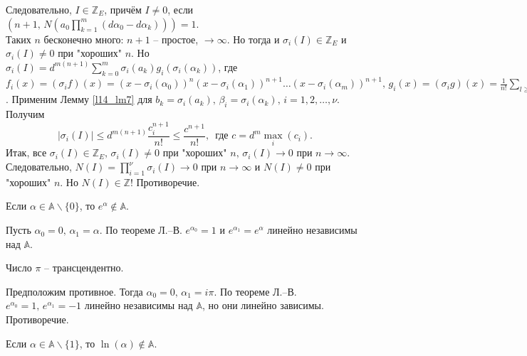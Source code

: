 \begin{pf}
	Следовательно, $I \in \mathbb{Z}_E$, причём $I \ne 0$, если $\displaystyle \left( n+1, \, N\left( a_0\prod\limits_{k=1}^m(d\alpha_0 - d\alpha_k) \right) \right) = 1$.\\
	Таких $n$ бесконечно много: $n+1$ -- простое, $\to \infty$. Но тогда и $\sigma_i(I) \in \mathbb{Z}_E$ и $\sigma_i(I) \ne 0$ при "хороших" $n$. Но $\displaystyle \sigma_i(I) = d^{m(n+1)} \sum\limits_{k=0}^m \sigma_i(a_k)g_i(\sigma_i(\alpha_k))$, где $f_i(x) = (\sigma_if)(x) = (x-\sigma_i(\alpha_0))^n(x-\sigma_i(\alpha_1))^{n+1}\dots(x-\sigma_i(\alpha_m))^{n+1}, \, g_i(x) = (\sigma_ig)(x) = \frac{1}{n!} \sum\limits_{l \geq n} f_i^{(l)}(x)$. 
	Применим Лемму \ref{l14_lm7} для $b_k = \sigma_i(a_k), \, \beta_i = \sigma_i(\alpha_k), \, i=1,2,\dots,\nu$. Получим
	$$\left| \sigma_i(I) \right| \leq d^{m(n+1)}\frac{c_i^{n+1}}{n!} \leq \frac{c^{n+1}}{n!}, \, \text{ где } c=d^m\max\limits_i(c_i).$$
	Итак, все $\sigma_i(I) \in \mathbb{Z}_E, \, \sigma_i(I) \ne 0$ при "хороших" $n, \, \sigma_i(I) \to 0$ при $n \to \infty$.\\
	Следовательно, $\displaystyle N(I) = \prod\limits_{i=1}^\nu \sigma_i(I) \to 0$ при $n \to \infty$ и $N(I) \ne 0$ при "хороших" $n$. Но $N(I) \in \mathbb{Z}$! 
	Противоречие.
\end{pf}

\begin{corollary}[из теоремы Л.--В.] \label{l14_cor1}
	Если $\alpha \in \mathbb{A} \backslash \{ 0 \}$, то $e^\alpha \not\in \mathbb{A}$.
\end{corollary}
\begin{pf}
	Пусть $\alpha_0 =0, \, \alpha_1=\alpha$. По теореме Л.--В. $e^{\alpha_0}=1$ и $e^{\alpha_1}=e^\alpha$ линейно независимы над $\mathbb{A}$.
\end{pf}

\begin{corollary} \label{l14_cor2}
	Число $\pi$ -- трансцендентно.
\end{corollary}
\begin{pf}
	Предположим противное. Тогда $\alpha_0 = 0, \, \alpha_1 = i\pi$. По теореме Л.--В. 
	$e^{\alpha_0} = 1, \, e^{\alpha_1} = -1$ линейно независимы над $\mathbb{A}$, но они линейно зависимы. 
	Противоречие.
\end{pf}

\begin{corollary} \label{l14_cor3}
	Если $\alpha \in \mathbb{A} \backslash \{ 1 \}$, то $\ln(\alpha) \not\in \mathbb{A}$.
\end{corollary}

